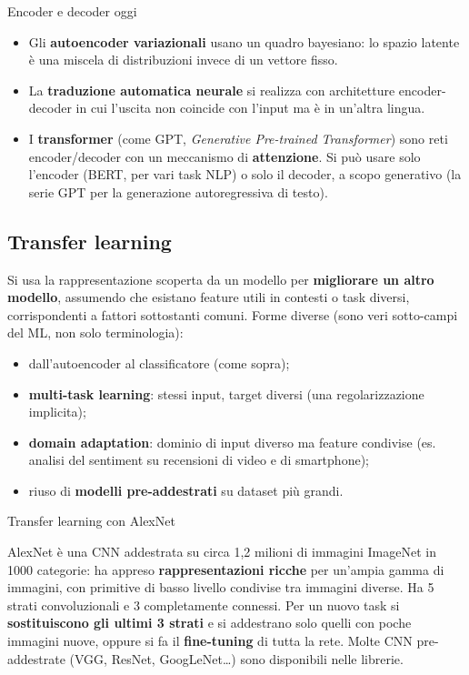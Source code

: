 \begin{boxnote}{Encoder e decoder oggi}

\begin{itemize}
\tightlist
\item
  Gli \textbf{autoencoder variazionali} usano un quadro bayesiano: lo
  spazio latente è una miscela di distribuzioni invece di un vettore
  fisso.
\item
  La \textbf{traduzione automatica neurale} si realizza con architetture
  encoder-decoder in cui l'uscita non coincide con l'input ma è in
  un'altra lingua.
\item
  I \textbf{transformer} (come GPT, \emph{Generative Pre-trained
  Transformer}) sono reti encoder/decoder con un meccanismo di
  \textbf{attenzione}. Si può usare solo l'encoder (BERT, per vari task
  NLP) o solo il decoder, a scopo generativo (la serie GPT per la
  generazione autoregressiva di testo).
\end{itemize}

\end{boxnote}

\subsection{Transfer learning}\label{transfer-learning}

Si usa la rappresentazione scoperta da un modello per \textbf{migliorare
un altro modello}, assumendo che esistano feature utili in contesti o
task diversi, corrispondenti a fattori sottostanti comuni. Forme diverse
(sono veri sotto-campi del ML, non solo terminologia):

\begin{itemize}
\tightlist
\item
  dall'autoencoder al classificatore (come sopra);
\item
  \textbf{multi-task learning}: stessi input, target diversi (una
  regolarizzazione implicita);
\item
  \textbf{domain adaptation}: dominio di input diverso ma feature
  condivise (es. analisi del sentiment su recensioni di video e di
  smartphone);
\item
  riuso di \textbf{modelli pre-addestrati} su dataset più grandi.
\end{itemize}

\begin{boxexample}{Transfer learning con AlexNet}

AlexNet è una CNN addestrata su circa 1,2 milioni di immagini ImageNet
in 1000 categorie: ha appreso \textbf{rappresentazioni ricche} per
un'ampia gamma di immagini, con primitive di basso livello condivise tra
immagini diverse. Ha 5 strati convoluzionali e 3 completamente connessi.
Per un nuovo task si \textbf{sostituiscono gli ultimi 3 strati} e si
addestrano solo quelli con poche immagini nuove, oppure si fa il
\textbf{fine-tuning} di tutta la rete. Molte CNN pre-addestrate (VGG,
ResNet, GoogLeNet\ldots) sono disponibili nelle librerie.

\end{boxexample}

